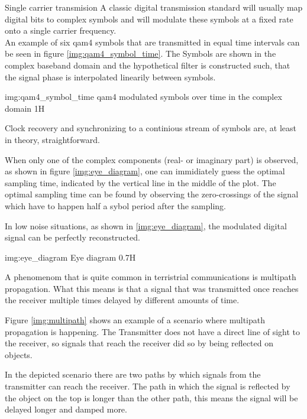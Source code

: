 \begin{subchapter}{Single carrier transmision}
  A classic digital transmission standard will usually map
  digital bits to complex symbols and will modulate these
  symbols at a fixed rate onto a single carrier frequency. \\

  An example of six \acrshort{qam4} symbols that are transmitted
  in equal time intervals can be seen in figure \ref{img:qam4_symbol_time}.
  The Symbols are shown in the complex baseband domain and the
  hypothetical filter is constructed such, that the signal
  phase is interpolated linearily between symbols.

               {img:qam4_symbol_time}
               {\acrshort{qam4} modulated symbols over time in the complex domain}
               {1}{H}

  Clock recovery and synchronizing to a continious stream of
  symbols are, at least in theory, straightforward.

  When only one of the complex components (real- or imaginary part)
  is observed, as shown in figure \ref{img:eye_diagram}, one can
  immidiately guess the optimal sampling time, indicated by the
  vertical line in the middle of the plot.
  The optimal sampling time can be found by observing the
  zero-crossings of the signal which have to happen half a
  sybol period after the sampling.

  In low noise situations, as shown in \ref{img:eye_diagram},
  the modulated digital signal can be perfectly reconstructed.

                  {img:eye_diagram}
                  {Eye diagram}
                  {0.7}{H}

  A phenomenom that is quite common in terristrial communications
  is multipath propagation.
  What this means is that a signal that was transmitted once reaches the
  receiver multiple times delayed by different amounts of time.

  Figure \ref{img:multipath} shows an example of a scenario where
  multipath propagation is happening.
  The Transmitter does not have a direct line of sight to the receiver,
  so signals that reach the receiver did so by being reflected
  on objects.

  In the depicted scenario there are two paths by which signals from
  the transmitter can reach the receiver.
  The path in which the signal is reflected by the object on
  the top is longer than the other path, this means the signal will
  be delayed longer and damped more.


\end{subchapter}
